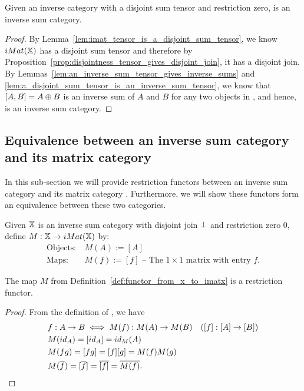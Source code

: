 \begin{theorem}\label{thm:imatx_is_an_inverse_sum_category}
  Given \X an inverse category with a disjoint sum tensor and restriction zero, \imatx is
  an inverse sum category.
\end{theorem}
\begin{proof}
  By Lemma~\ref{lem:imat_tensor_is_a_disjoint_sum_tensor}, we know $iMat({\mathbb{X}})$ has a disjoint sum
  tensor and therefore by Proposition~\ref{prop:disjointness_tensor_gives_disjoint_join},
  it has a disjoint join. By Lemmas~\ref{lem:an_inverse_sum_tensor_gives_inverse_sums} and
  \ref{lem:a_disjoint_sum_tensor_is_an_inverse_sum_tensor}, we know that $[A,B] = A\oplus B$ is
  an inverse sum of $A$ and $B$ for any two objects in \imatx, and hence, \imatx is an inverse
  sum category.
\end{proof}

\subsection{Equivalence between an inverse sum category and its matrix category} %
\label{sub:equivalence_between_an_inverse_sum_category_and_its_matrix_category}
In this sub-section we will provide restriction functors between an inverse sum category
\X and its matrix category \imatx. Furthermore, we will show these functors form an
equivalence between these two categories.

\begin{definition}\label{def:functor_from_x_to_imatx}
  Given $\mathbb{X}$ is an inverse sum category with disjoint join $\perp$ and restriction zero $0$,
  define $M:\mathbb{X} \to iMat({\mathbb{X}})$ by:
  \begin{align*}
    \text{Objects:}\ &M(A) := [A]\\
    \text{Maps:}\ &M(f) := [f] \text{ -- The }1\times1\text{ matrix with entry }f.
  \end{align*}
\end{definition}
\begin{lemma}\label{lem:m_is_a_functor}
  The map $M$ from Definition~\ref{def:functor_from_x_to_imatx} is a restriction functor.
\end{lemma}
\begin{proof}
  From the definition of \imatx, we have
  \begin{align*}
    &f: A\to B  \iff M(f):M(A)\to M(B)\quad ([f]: [A]\to [B])\\
    &M(id_A)  = [id_{A}] = id_M(A)\\
    &M(f g) = [f g] = [f][g] = M(f) M(g)\\
    &M(\overline{f}) = [\overline{f}] = \overline{[f]} = \overline{M(f)}.
  \end{align*}
\end{proof}


